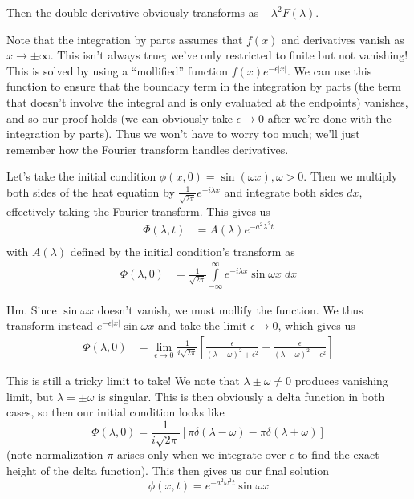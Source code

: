 \documentclass[10pt]{report}
\newcommand{\abs}[1]{\left|#1\right|}
\begin{document}
Then the double derivative obviously transforms as $-\lambda^2 F(\lambda)$. 

Note that the integration by parts assumes that $f(x)$ and derivatives vanish as $x \to \pm \infty$. This isn't always true; we've only restricted to finite but not vanishing! This is solved by using a ``mollified'' function $f(x) e^{-\epsilon \abs{x}}$. We can use this function to ensure that the boundary term in the integration by parts (the term that doesn't involve the integral and is only evaluated at the endpoints) vanishes, and so our proof holds (we can obviously take $\epsilon \to 0$ after we're done with the integration by parts). Thus we won't have to worry too much; we'll just remember how the Fourier transform handles derivatives.

Let's take the initial condition $\phi(x,0) = \sin(\omega x), \omega > 0$. Then we multiply both sides of the heat equation by $\frac{1}{\sqrt{2\pi}}e^{-i\lambda x}$ and integrate both sides $dx$, effectively taking the Fourier transform. This gives us
\begin{align}
    \Phi(\lambda,t) &= A(\lambda)e^{-a^2\lambda^2t}\\
\end{align}
with $A(\lambda)$ defined by the initial condition's transform as
\begin{align}
    \Phi(\lambda,0) &= \frac{1}{\sqrt{2\pi}}\int\limits_{-\infty}^{\infty}e^{-i\lambda x}\sin \omega x\;dx
\end{align}

Hm. Since $\sin \omega x$ doesn't vanish, we must mollify the function. We thus transform instead $e^{-\epsilon \abs{x}}\sin \omega x$ and take the limit $\epsilon \to 0$, which gives us
\begin{align}
    \Phi(\lambda,0) &= \lim_{\epsilon \to 0}\frac{1}{i\sqrt{2\pi}} \left[ \frac{\epsilon}{(\lambda - \omega)^2 + \epsilon^2} - \frac{\epsilon}{(\lambda + \omega)^2 + \epsilon^2} \right]
\end{align}

This is still a tricky limit to take! We note that $\lambda \pm  \omega \neq 0$ produces vanishing limit, but $\lambda = \pm \omega$ is singular. This is then obviously a delta function in both cases, so then our initial condition looks like 
\begin{equation}
        \Phi(\lambda,0) = \frac{1}{i\sqrt{2\pi}} \left[ \pi \delta(\lambda - \omega) - \pi \delta(\lambda + \omega) \right]
\end{equation}
(note normalization $\pi$ arises only when we integrate over $\epsilon$ to find the exact height of the delta function). This then gives us our final solution
\begin{equation}
    \phi(x,t) = e^{-a^2 \omega^2 t}\sin \omega x
\end{equation}
\end{document}
